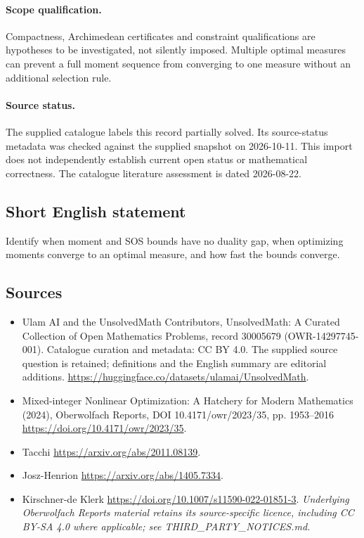 \documentclass[11pt]{article}
\begin{document}
\paragraph{Scope qualification.}
Compactness, Archimedean certificates and constraint qualifications are hypotheses to be investigated, not silently imposed. Multiple optimal measures can prevent a full moment sequence from converging to one measure without an additional selection rule.
\paragraph{Source status.}
The supplied catalogue labels this record partially solved. Its source-status metadata was checked against the supplied snapshot on 2026-10-11. This import does not independently establish current open status or mathematical correctness. The catalogue literature assessment is dated 2026-08-22.
\subsection{Short English statement}
Identify when moment and SOS bounds have no duality gap, when optimizing moments converge to an optimal measure, and how fast the bounds converge.
\subsection{Sources}
\begin{itemize}
\item[S1] Ulam AI and the UnsolvedMath Contributors, UnsolvedMath: A Curated Collection of Open Mathematics Problems, record 30005679 (OWR-14297745-001). Catalogue curation and metadata: CC BY 4.0. The supplied source question is retained; definitions and the English summary are editorial additions.
\url{https://huggingface.co/datasets/ulamai/UnsolvedMath}.
\item[S2] Mixed-integer Nonlinear Optimization: A Hatchery for Modern Mathematics (2024), Oberwolfach Reports, DOI 10.4171/owr/2023/35, pp. 1953--2016
\url{https://doi.org/10.4171/owr/2023/35}.
\item[S3] Tacchi
\url{https://arxiv.org/abs/2011.08139}.
\item[S4] Josz-Henrion
\url{https://arxiv.org/abs/1405.7334}.
\item[S5] Kirschner-de Klerk
\url{https://doi.org/10.1007/s11590-022-01851-3}.
\textit{Underlying Oberwolfach Reports material retains its source-specific licence, including CC BY-SA 4.0 where applicable; see THIRD\_PARTY\_NOTICES.md.}
\end{itemize}
\end{document}
